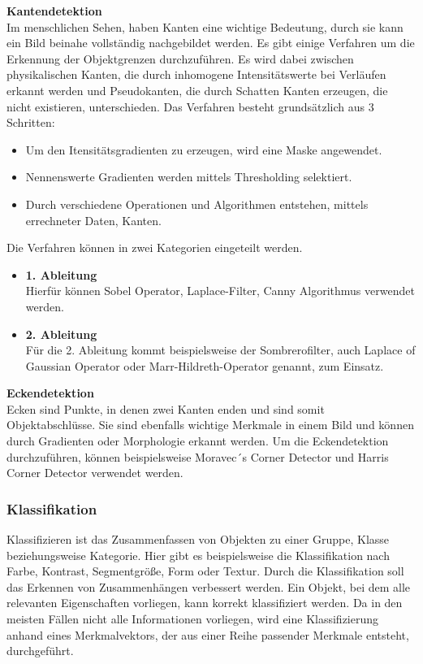     \textbf{Kantendetektion}\\
    Im menschlichen Sehen, haben Kanten eine wichtige Bedeutung, durch sie kann ein Bild beinahe vollständig nachgebildet werden. Es gibt einige Verfahren um die Erkennung der Objektgrenzen durchzuführen. Es wird dabei zwischen physikalischen Kanten, die durch inhomogene Intensitätswerte bei Verläufen erkannt werden und Pseudokanten, die durch Schatten Kanten erzeugen, die nicht existieren, unterschieden.
    Das Verfahren besteht grundsätzlich aus 3 Schritten:
    \begin{itemize}
        \item Um den Itensitätsgradienten zu erzeugen, wird eine Maske angewendet.
        \item Nennenswerte Gradienten werden mittels Thresholding selektiert.
        \item Durch verschiedene Operationen und Algorithmen entstehen, mittels errechneter Daten, Kanten.
    \end{itemize}
    Die Verfahren können in zwei Kategorien eingeteilt werden.
    \begin{itemize}
        \item \textbf{1. Ableitung}\\
        Hierfür können Sobel Operator, Laplace-Filter, Canny Algorithmus verwendet werden.
        \item \textbf{2. Ableitung}\\
        Für die 2. Ableitung kommt beispielsweise der Sombrerofilter, auch Laplace of Gaussian Operator oder Marr-Hildreth-Operator genannt, zum Einsatz.
    \end{itemize}

    \textbf{Eckendetektion}\\
    Ecken sind Punkte, in denen zwei Kanten enden und sind somit Objektabschlüsse. Sie sind ebenfalls wichtige Merkmale in einem Bild und können durch Gradienten oder Morphologie erkannt werden. Um die Eckendetektion\cite{Bildverarbeitung} durchzuführen, können beispielsweise Moravec´s Corner Detector und Harris Corner Detector verwendet werden.

    \subsubsection{Klassifikation}
    Klassifizieren\cite{Bildverarbeitung} ist das Zusammenfassen von Objekten zu einer Gruppe, Klasse beziehungsweise Kategorie. Hier gibt es beispielsweise die Klassifikation nach Farbe, Kontrast, Segmentgröße, Form oder Textur. Durch die Klassifikation soll das Erkennen von Zusammenhängen verbessert werden. Ein Objekt, bei dem alle relevanten Eigenschaften vorliegen, kann korrekt klassifiziert werden. Da in den meisten Fällen nicht alle Informationen vorliegen, wird eine Klassifizierung anhand eines Merkmalvektors, der aus einer Reihe passender Merkmale entsteht, durchgeführt. 


